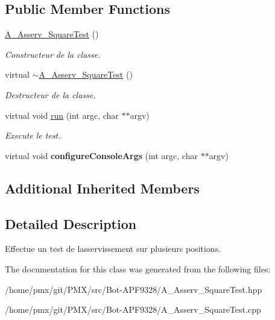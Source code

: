 \subsection*{Public Member Functions}
\begin{DoxyCompactItemize}
\item 
\mbox{\label{classA__Asserv__SquareTest_a7dfa3b2120195074baeb43c31e472b32}} 
\hyperlink{classA__Asserv__SquareTest_a7dfa3b2120195074baeb43c31e472b32}{A\+\_\+\+Asserv\+\_\+\+Square\+Test} ()
\begin{DoxyCompactList}\small\item\em Constructeur de la classe. \end{DoxyCompactList}\item 
\mbox{\label{classA__Asserv__SquareTest_ad67da3e1af6159b5c3efea79dd6c3ed8}} 
virtual \hyperlink{classA__Asserv__SquareTest_ad67da3e1af6159b5c3efea79dd6c3ed8}{$\sim$\+A\+\_\+\+Asserv\+\_\+\+Square\+Test} ()
\begin{DoxyCompactList}\small\item\em Destructeur de la classe. \end{DoxyCompactList}\item 
\mbox{\label{classA__Asserv__SquareTest_ac79fb82ae484354c587c6fd925c6c599}} 
virtual void \hyperlink{classA__Asserv__SquareTest_ac79fb82ae484354c587c6fd925c6c599}{run} (int argc, char $\ast$$\ast$argv)
\begin{DoxyCompactList}\small\item\em Execute le test. \end{DoxyCompactList}\item 
\mbox{\label{classA__Asserv__SquareTest_a484f017e34e6208c77c9c8ad8746abb4}} 
virtual void {\bfseries configure\+Console\+Args} (int argc, char $\ast$$\ast$argv)
\end{DoxyCompactItemize}
\subsection*{Additional Inherited Members}


\subsection{Detailed Description}
Effectue un test de l\textquotesingle{}asservissement sur plusieurs positions. 

The documentation for this class was generated from the following files\+:\begin{DoxyCompactItemize}
\item 
/home/pmx/git/\+P\+M\+X/src/\+Bot-\/\+A\+P\+F9328/A\+\_\+\+Asserv\+\_\+\+Square\+Test.\+hpp\item 
/home/pmx/git/\+P\+M\+X/src/\+Bot-\/\+A\+P\+F9328/A\+\_\+\+Asserv\+\_\+\+Square\+Test.\+cpp\end{DoxyCompactItemize}
